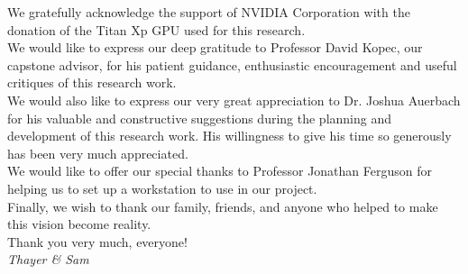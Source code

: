 \begin{acknowledgements}
\label{ch:Acknowledgements}

We gratefully acknowledge the support of NVIDIA Corporation with the donation of the Titan Xp GPU used for this research. \\

We would like to express our deep gratitude to Professor David Kopec, our capstone advisor, for his patient guidance, enthusiastic encouragement and useful critiques of this research work. \\

We would also like to express our very great appreciation to Dr. Joshua Auerbach for his valuable and constructive suggestions during the planning and development of this research work. His willingness to give his time so generously has been very much appreciated. \\

We would like to offer our special thanks to Professor Jonathan Ferguson for helping us to set up a workstation to use in our project.\\

Finally, we wish to thank our family, friends, and anyone who helped to make this vision become reality. \\

Thank you very much, everyone! \\

\textit{Thayer \& Sam}

\end{acknowledgements}
